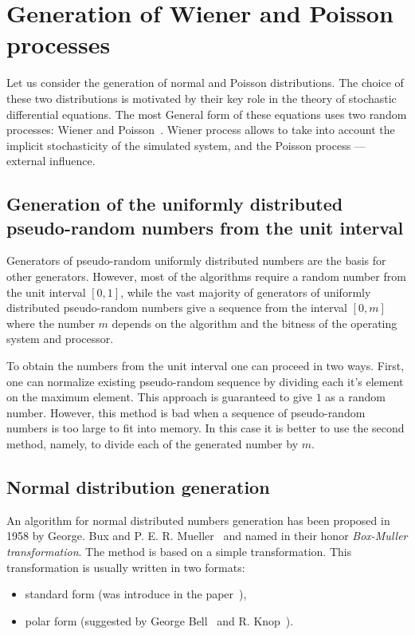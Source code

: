 \documentclass[%
floatfix,
showkeys,
nofootinbib, %
superscriptaddress, %
]{revtex4-1}
\begin{document}
\section{Generation of Wiener and Poisson processes}

Let us consider the generation of normal and Poisson
distributions. The choice of these two distributions is motivated by
their key role in the theory of stochastic differential equations. The
most General form of these equations uses two random processes: Wiener
and Poisson~\cite{L_Platen_Bruti}. Wiener process allows to take into
account the implicit stochasticity of the simulated system, and the
Poisson process --- external influence.

\subsection{Generation of the uniformly distributed pseudo-random numbers from the unit interval}

Generators of pseudo-random uniformly distributed numbers are the
basis for other generators. However, most of the algorithms require a
random number from the unit interval $[0,1]$, while the vast majority
of generators of uniformly distributed pseudo-random numbers give a
sequence from the interval $[0, m]$ where the number $m$ depends on
the algorithm and the bitness of the operating system and processor.


To obtain the numbers from the unit interval one can proceed in two
ways. First, one can normalize existing pseudo-random sequence by
dividing each it's element on the maximum element. This approach is
guaranteed to give $1$ as a random number. However, this method is bad
when a sequence of pseudo-random numbers is too large to fit into
memory. In this case it is better to use the second method, namely, to
divide each of the generated number by $m$.

\subsection{Normal distribution generation}

An algorithm for normal distributed numbers generation has been
proposed in 1958 by George. Bux and
P. E. R. Mueller~\cite{L_BoxMuller:1958} and named in their honor
\textit{Box-Muller transformation}. The method is based on a simple
transformation. This transformation is usually written in two formats:
\begin{itemize}
  \item standard form (was introduce in the paper~\cite{L_BoxMuller:1958}),
  \item polar form (suggested by George Bell~\cite{L_Bell:1968} and R. Knop~\cite{L_Knop:1969}).
\end{itemize}
\end{document}
